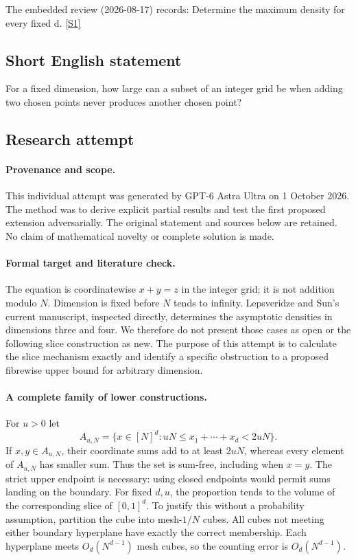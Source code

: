 \documentclass[11pt,a4paper]{article}
\newcommand{\sref}[2]{\hyperlink{source:#1:#2}{[S#2]}}
\begin{document}
The embedded review (2026-08-17) records: Determine the maximum density for every fixed d. \sref{98}{1}

\subsection{Short English statement}

For a fixed dimension, how large can a subset of an integer grid be when adding two chosen points never produces another chosen point?

\subsection{Research attempt}

\paragraph{Provenance and scope.}
This individual attempt was generated by GPT-6 Astra Ultra on 1 October 2026. The method was to derive explicit partial results and test the first proposed extension adversarially. The original statement and sources below are retained. No claim of mathematical novelty or complete solution is made.

\paragraph{Formal target and literature check.}
The equation is coordinatewise $x+y=z$ in the integer grid; it is not addition modulo $N$. Dimension is fixed before $N$ tends to infinity. Lepsveridze and Sun's current manuscript, inspected directly, determines the asymptotic densities in dimensions three and four. We therefore do not present those cases as open or the following slice construction as new. The purpose of this attempt is to calculate the slice mechanism exactly and identify a specific obstruction to a proposed fibrewise upper bound for arbitrary dimension.

\paragraph{A complete family of lower constructions.}
For $u>0$ let
\[
 A_{u,N}=\{x\in[N]^d:uN\leq x_1+\cdots+x_d<2uN\}.
\]
If $x,y\in A_{u,N}$, their coordinate sums add to at least $2uN$, whereas every element of $A_{u,N}$ has smaller sum. Thus the set is sum-free, including when $x=y$. The strict upper endpoint is necessary: using closed endpoints would permit sums landing on the boundary.
For fixed $d,u$, the proportion tends to the volume of the corresponding slice of $[0,1]^d$. To justify this without a probability assumption, partition the cube into mesh-$1/N$ cubes. All cubes not meeting either boundary hyperplane have exactly the correct membership. Each hyperplane meets $O_d(N^{d-1})$ mesh cubes, so the counting error is $O_d(N^{d-1})$.
\end{document}
